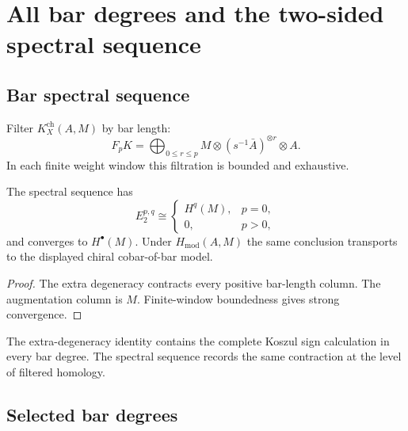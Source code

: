 \section{All bar degrees and the two-sided spectral sequence}
\label{sec:tbsp-higher-bar-degrees-valpha1}

\subsection{Bar spectral sequence}
\label{subsec:tbsp-bar-ss-valpha1}

\begin{definition}
\label{def:tbsp-bar-spectral-sequence}
Filter \(K_X^{\mathrm{ch}}(A,M)\) by bar length:
\[
 F_pK=\bigoplus_{0\leq r\leq p}
 M\otimes(s^{-1}\bar A)^{\otimes r}\otimes A .
\]
In each finite weight window this filtration is bounded and
exhaustive.
\end{definition}

\begin{lemma}
\label{lem:tbsp-bar-ss-collapse}
The spectral sequence has
\[
 E_2^{p,q}\cong
 \begin{cases}
 H^q(M),&p=0,\\
 0,&p>0,
 \end{cases}
\]
and converges to \(H^\bullet(M)\).  Under \(H_{\mathrm{mod}}(A,M)\)
the same conclusion transports to the displayed chiral
cobar-of-bar model.
\end{lemma}

\begin{proof}
The extra degeneracy contracts every positive bar-length column.
The augmentation column is \(M\).  Finite-window boundedness gives
strong convergence.
\end{proof}

\begin{remark}
\label{rem:tbsp-exponential-signs}
The extra-degeneracy identity contains the complete Koszul sign
calculation in every bar degree.  The spectral sequence records the
same contraction at the level of filtered homology.
\end{remark}

\subsection{Selected bar degrees}
\label{subsec:tbsp-n456-valpha1}

